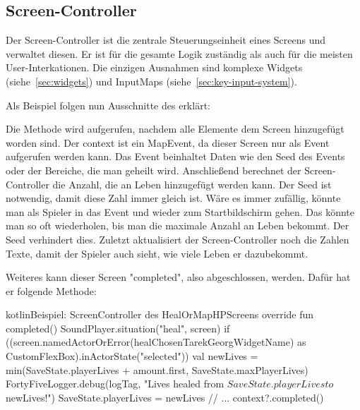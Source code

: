 \renewcommand{\kapitelautor}{Autor: Felix Zwickelstorfer}
\subsection{Screen-Controller}\label{subsec:screen-controller}
\renewcommand{\kapitelautor}{Autor: Felix Zwickelstorfer}
Der Screen-Controller ist die zentrale Steuerungseinheit eines Screens und verwaltet diesen.
Er ist für die gesamte Logik zuständig als auch für die meisten User-Interkationen.
Die einzigen Ausnahmen sind komplexe Widgets (siehe~\ref{sec:widgets}) und InputMaps (siehe~\ref{sec:key-input-system}).

Als Beispiel folgen nun Ausschnitte des  erklärt:


Die  Methode wird aufgerufen, nachdem alle Elemente dem Screen hinzugefügt worden sind.
Der context ist ein MapEvent, da dieser Screen nur als Event aufgerufen werden kann.
Das Event beinhaltet Daten wie den Seed des Events oder der Bereiche, die man geheilt wird.
Anschließend berechnet der Screen-Controller die Anzahl, die an Leben hinzugefügt werden kann.
Der Seed ist notwendig, damit diese Zahl immer gleich ist.
Wäre es immer zufällig, könnte man als Spieler in das Event und wieder zum Startbildschirm gehen.
Das könnte man so oft wiederholen, bis man die maximale Anzahl an Leben bekommt.
Der Seed verhindert dies.
Zuletzt aktualisiert der Screen-Controller noch die Zahlen Texte, damit der Spieler auch sieht, wie viele Leben er dazubekommt.

Weiteres kann dieser Screen "completed", also abgeschlossen, werden.
Dafür hat er folgende Methode:
\begin{codeBlock}{kotlin}{Beispiel: Screen\-Controller des HealOrMapHP\-Screens}
    override fun completed() {
        SoundPlayer.situation("heal", screen)
        if ((screen.namedActorOrError(healChosenTarekGeorgWidgetName) as CustomFlexBox).inActorState("selected")) {
            val newLives = min(SaveState.playerLives + amount.first, SaveState.maxPlayerLives)
            FortyFiveLogger.debug(logTag, "Lives healed from ${SaveState.playerLives} to $newLives!")
            SaveState.playerLives = newLives
        }
        // ...
        context?.completed()
    }
\end{codeBlock}

